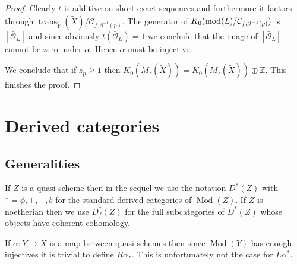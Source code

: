 \documentclass{amsproc}
\def \ZZ{{\mathbb Z}}
\def\Cscr{{\mathcal C}}
\def\Oscr{{\mathcal O}}
\def\mod{\mathop{\text{mod}}}
\def\trans{\operatorname{trans}}
\def\Qch{\operatorname {Mod}}
\def\r{\rightarrow}
\let\oldtext\text
\def\text#1{\oldtext{\upshape #1}}
\theoremstyle{definition}
\theoremstyle{remark}
\numberwithin{equation}{section}
\numberwithin{table}{section}
\numberwithin{figure}{section}
\begin{document}
\begin{proof}
Clearly $t$ is additive on short exact sequences and
furthermore  it factors through $\trans_{\tilde{Y}}(\tilde{X})/
\Cscr_{f,\beta^{-1}(p)}$. The generator of
$K_0(\mod(L)/\Cscr_{f,\beta^{-1}(p)})$ is $[\bar{\Oscr}_L]$ and since
obviously $t(\bar{\Oscr}_L)=1$ we conclude that the image of
$[\bar{\Oscr}_L]$ cannot be zero under $\alpha$. Hence $\alpha$ must
be injective. 

We conclude that if $z_{\bar{p}}\ge 1$ then
$K_0(M_z(\tilde{X}))=K_0(\bar{M}_z(\tilde{X}))\oplus \ZZ$. This
finishes the proof.
\end{proof}






\section{Derived categories}
\label{ref:7a}

\subsection{Generalities}
\label{ref:7.1a}
If $Z$ is a quasi-scheme then in the sequel we use the notation
$D^\ast(Z)$ with $\ast=\phi,+,-,b$ for the standard derived categories of
$\Qch(Z)$. If $Z$ is  noetherian then we use $D_f^\ast(Z)$ for
the full subcategories of $D^\ast(Z)$ whose objects have coherent
cohomology.

If $\alpha:Y\r X$ is a map between quasi-schemes then since $\Qch(Y)$
has enough injectives it is trivial to define $R\alpha_\ast$. This is
unfortunately not the case for $L\alpha^\ast$.
\end{document}

